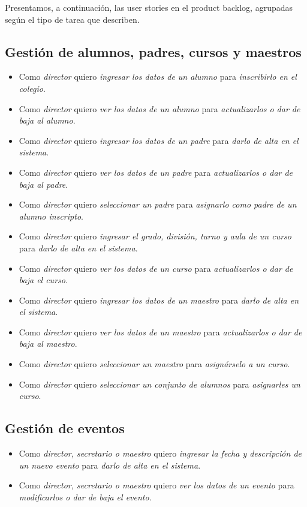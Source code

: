 \documentclass[a4paper, 10pt, twoside]{article}
\newenvironment{stories}{
  \begin{itemize}
}{
  \end{itemize}
}
\newcommand{\story}[3]{
  \item
  Como \emph{#1} quiero \emph{#2} para \emph{#3}.
}
\begin{document}
Presentamos, a continuación, las user stories en el product backlog, agrupadas según el tipo de tarea que describen.


\subsection{Gestión de alumnos, padres, cursos y maestros}

\begin{stories}
  \story{director}
        {ingresar los datos de un alumno}
        {inscribirlo en el colegio}

  \story{director}
        {ver los datos de un alumno}
        {actualizarlos o dar de baja al alumno}

  \story{director}
        {ingresar los datos de un padre}
        {darlo de alta en el sistema}

  \story{director}
        {ver los datos de un padre}
        {actualizarlos o dar de baja al padre}

  \story{director}
        {seleccionar un padre}
        {asignarlo como padre de un alumno inscripto}

  \story{director}
        {ingresar el grado, división, turno y aula de un curso}
        {darlo de alta en el sistema}

  \story{director}
        {ver los datos de un curso}
        {actualizarlos o dar de baja el curso}

  \story{director}
        {ingresar los datos de un maestro}
        {darlo de alta en el sistema}

  \story{director}
        {ver los datos de un maestro}
        {actualizarlos o dar de baja al maestro}

  \story{director}
        {seleccionar un maestro}
        {asignárselo a un curso}

  \story{director}
        {seleccionar un conjunto de alumnos}
        {asignarles un curso}
\end{stories}


\subsection{Gestión de eventos}

\begin{stories}
  \story{director, secretario o maestro}
        {ingresar la fecha y descripción de un nuevo evento}
        {darlo de alta en el sistema}

  \story{director, secretario o maestro}
        {ver los datos de un evento}
        {modificarlos o dar de baja el evento}
\end{stories}
\end{document}
